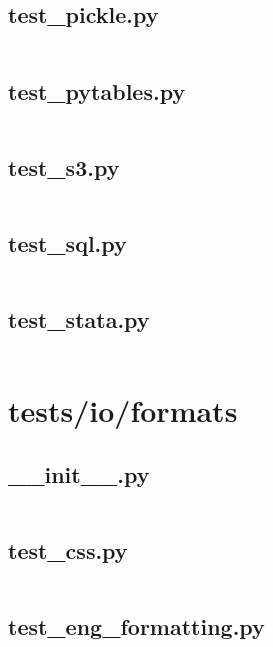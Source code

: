 \documentclass{article}
\begin{document}
\subsection{test\_pickle.py}
\inputminted{python}{/home/dufferzafar/dev/@clones/pandas/pandas/tests/io/test_pickle.py}
\newpage

\subsection{test\_pytables.py}
\inputminted{python}{/home/dufferzafar/dev/@clones/pandas/pandas/tests/io/test_pytables.py}
\newpage

\subsection{test\_s3.py}
\inputminted{python}{/home/dufferzafar/dev/@clones/pandas/pandas/tests/io/test_s3.py}
\newpage

\subsection{test\_sql.py}
\inputminted{python}{/home/dufferzafar/dev/@clones/pandas/pandas/tests/io/test_sql.py}
\newpage

\subsection{test\_stata.py}
\inputminted{python}{/home/dufferzafar/dev/@clones/pandas/pandas/tests/io/test_stata.py}
\newpage

\section{tests/io/formats}

\subsection{\_\_init\_\_.py}
\inputminted{python}{/home/dufferzafar/dev/@clones/pandas/pandas/tests/io/formats/__init__.py}
\newpage

\subsection{test\_css.py}
\inputminted{python}{/home/dufferzafar/dev/@clones/pandas/pandas/tests/io/formats/test_css.py}
\newpage

\subsection{test\_eng\_formatting.py}
\inputminted{python}{/home/dufferzafar/dev/@clones/pandas/pandas/tests/io/formats/test_eng_formatting.py}
\newpage
\end{document}
